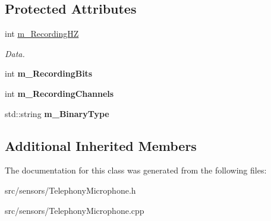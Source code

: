 \subsection*{Protected Attributes}
\begin{DoxyCompactItemize}
\item 
\mbox{\label{class_telephony_microphone_ad64d01d130659c54a857c655a8ebc93d}} 
int \hyperlink{class_telephony_microphone_ad64d01d130659c54a857c655a8ebc93d}{m\+\_\+\+Recording\+HZ}
\begin{DoxyCompactList}\small\item\em Data. \end{DoxyCompactList}\item 
\mbox{\label{class_telephony_microphone_a9ae78c623cc36e53989982f18f46b42d}} 
int {\bfseries m\+\_\+\+Recording\+Bits}
\item 
\mbox{\label{class_telephony_microphone_ad939b85268144fdcead83040447ed5eb}} 
int {\bfseries m\+\_\+\+Recording\+Channels}
\item 
\mbox{\label{class_telephony_microphone_a992dcfbe72e789fc85bb8c5a869671b8}} 
std\+::string {\bfseries m\+\_\+\+Binary\+Type}
\end{DoxyCompactItemize}
\subsection*{Additional Inherited Members}


The documentation for this class was generated from the following files\+:\begin{DoxyCompactItemize}
\item 
src/sensors/Telephony\+Microphone.\+h\item 
src/sensors/Telephony\+Microphone.\+cpp\end{DoxyCompactItemize}
